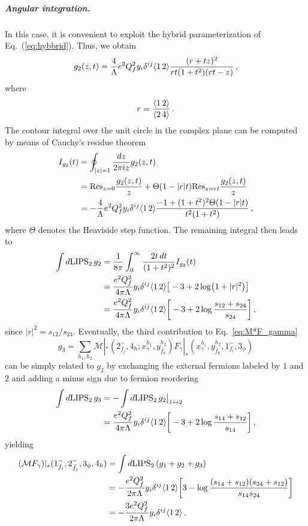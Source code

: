 \subparagraph{Angular integration.}
%
In this case, it is convenient to exploit the hybrid parameterization of
Eq.~(\ref{eq:hybbrid}). Thus, we obtain
\begin{equation}
    g_2(z,t) = \frac{4}{\Lambda}e^2 Q_f^2 y_i\delta^{ij}\langle1\, 2 \rangle\frac{(r+tz)^2}{rt(1+t^2)(rt-z)}\,,
\end{equation}
where
\begin{equation}
    r = \frac{\langle1\, 2 \rangle}{\langle2\, 4 \rangle}\,.
\end{equation}
The contour integral over the unit circle in the complex plane can be computed by means of Cauchy's residue theorem
\begin{align}
    I_{g_2}(t) &= \oint_{|z|=1}\frac{dz}{2\pi i z}g_2(z,t)\nonumber \\
    &= \text{Res}_{z=0}\frac{g_2(z,t)}{z} + \Theta(1-|r|t)\text{Res}_{z=rt}\frac{g_2(z,t)}{z}\nonumber \\
    &= -\frac{4}{\Lambda}e^2 Q_f^2 y_i\delta^{ij}\langle1\, 2 \rangle \frac{-1+(1+t^2)^2 \Theta(1-|r|t)}{t^2(1+t^2)}\,,
\end{align}
where $\Theta$ denotes the Heaviside step function.
The remaining integral then leads to
\begin{align}
    \int d\text{LIPS}_2\, g_2 &= \frac{1}{8\pi}\int_0^\infty \frac{2t\,dt}{(1+t^2)^2}I_{g_2}(t)\nonumber \\
    &= \frac{e^2 Q_f^2}{4\pi\Lambda}y_i\delta^{ij}\langle1\, 2 \rangle\big[-3+2\log(1+|r|^2)\big]\nonumber  \\
    &= \frac{e^2 Q_f^2}{4\pi\Lambda}y_i\delta^{ij}\langle1\, 2 \rangle\bigg[-3+2\log\frac{s_{12}+s_{24}}{s_{24}}\bigg]\,,
\end{align}
since $|r|^2=s_{12}/s_{24}$.
Eventually, the third contribution to Eq.~\eqref{eq:M*F_gamma}
\begin{equation}
    g_3 = \sum_{h_1,h_2} \mathcal M|_*(2_{\bar f_j}^-,4_h;x_\gamma^{h_1},y_{\bar f_k}^{h_2}) F_\gamma|_*(x_\gamma^{h_1},y_{\bar f_k}^{h_2},1_{f_i}^-,3_\phi)
\end{equation}
can be simply related to $g_2$ by exchanging the external fermions labeled by $1$ and $2$ and adding a minus sign due to fermion reordering
\begin{align}
    \int d\text{LIPS}_2\,g_3 &= -\int d\text{LIPS}_2\,g_2\big|_{1\leftrightarrow 2}\nonumber\\
    & = \frac{e^2 Q_f^2}{4\pi\Lambda}y_i\delta^{ij}\langle1\, 2 \rangle\bigg[-3+2\log\frac{s_{14}+s_{12}}{s_{14}}\bigg]\,,
    \label{eq:g3_reorder}
\end{align}
yielding
\begin{align}
    (\mathcal M F_\gamma)|_*(1_{f_i}^-,2_{\bar f_j}^-,3_\phi,4_h) &= \int d\text{LIPS}_2\,(g_1+g_2+g_3) 
    \nonumber \\ &= -\frac{e^2Q_f^2}{2\pi\Lambda}y_i \delta^{ij} \langle1\, 2 \rangle\bigg[3-\log\frac{(s_{14}+s_{12})(s_{24}+s_{12})}{s_{14} s_{24}}\bigg]\nonumber \\
    &= -\frac{3e^2Q_f^2}{2\pi\Lambda}y_i \delta^{ij} \langle1\, 2 \rangle\,,
\end{align}

